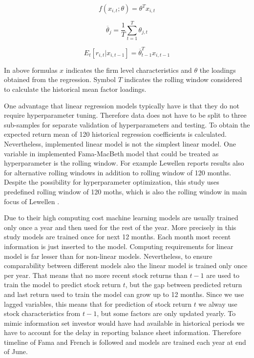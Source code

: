 \documentclass{article}
\begin{document}
\begin{equation}
f(x_{i, t}; \theta) = \theta^T x_{i, t}
\end{equation}

\begin{equation}
\overline \theta_j = \frac{1}{T} \sum^{T}_{t=1}\theta_{j, t}
\end{equation}

\begin{equation}
E_t \left[ r_{i, t} | x_{i, t-1} \right] = \overline \theta_{t-1}^T x_{i, t-1}
\end{equation}

In above formulas $x$ indicates the firm level characteristics and $\theta$ the loadings obtained from the regression. Symbol $T$ indicates the rolling window considered to calculate the historical mean factor loadings. \par

One advantage that linear regression models typically have is that they do not require hyperparameter tuning. Therefore data  does not have to be split to three sub-samples for separate validation of hyperparameters and testing. To obtain the expected return mean of 120 historical regression coefficients is calculated. Nevertheless, implemented linear model is not the simplest linear model. One variable in implemented Fama-MacBeth model that could be treated as hyperparameter is the rolling window. For example Lewellen \citeyear{Lewellen2015} reports results also for alternative rolling windows in addition to rolling window of 120 months. Despite the possibility for hyperparameter optimization, this study uses predefined rolling window of 120 moths, which is also the rolling window in main focus of Lewellen \citeyear{Lewellen2015}. \par

Due to their high computing cost machine learning models are usually trained only once a year and then used for the rest of the year. More precisely in this study models are trained once for next 12 months. Each month most recent information is just inserted to the model. Computing requirements for linear model is far lesser than for non-linear models. Nevertheless, to ensure comparability between different models also the linear model is trained only once per year. That means that no more recent stock returns than $t-1$ are used to train the model to predict stock return $t$, but the gap between predicted return and last return used to train the model can grow up to 12 months. Since we use lagged variables, this means that for prediction of stock return $t$ we alway use stock characteristics from $t-1$, but some factors are only updated yearly. To mimic information set investor would have had available in historical periods we have to account for the delay in reporting balance sheet information. Therefore timeline of Fama and French \citeyear{FAMA19933} is followed and models are trained each year at end of June. \par
\end{document}
